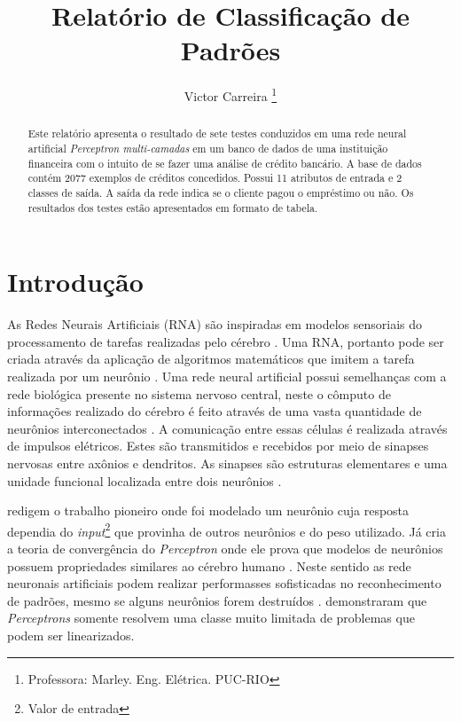 \documentclass[journal, a4paper]{IEEEtran}
\begin{document}
	\title{Relatório de Classificação de Padrões}
	\author{Victor Carreira
	\thanks{Professora: Marley. Eng. Elétrica. PUC-RIO}}
	\maketitle

\begin{abstract}
	Este relatório apresenta o resultado de sete testes conduzidos em uma rede neural artificial \textit{Perceptron multi-camadas} em um banco de dados de uma instituição financeira com o intuito de se fazer uma análise de crédito bancário.  A base de dados contém 2077 exemplos de créditos concedidos. Possui 11 atributos de entrada e 2 classes de saída. A saída da rede indica se o cliente pagou o empréstimo ou não. Os resultados dos testes estão apresentados em formato de tabela.
\end{abstract}

\section{Introdução}
    As Redes Neurais Artificiais (RNA) são inspiradas em modelos sensoriais do processamento de tarefas realizadas pelo cérebro \citep{Hagan1996}. Uma RNA, portanto pode ser criada através da aplicação de algoritmos matemáticos que imitem a tarefa realizada por um neurônio \citep{Nedjah2016}. Uma rede neural artificial possui semelhanças com a rede biológica presente no sistema nervoso central, neste o cômputo de informações realizado do cérebro é feito através de uma vasta quantidade de neurônios interconectados \citep{Feldman1988,Poulton2002}. A comunicação entre essas células é realizada através de impulsos elétricos. Estes são transmitidos e recebidos por meio de sinapses nervosas entre axônios e dendritos. As sinapses são estruturas elementares e uma unidade funcional localizada entre dois neurônios \citep{Krogh2008}.

	\citet{McCulloch1943} redigem o trabalho pioneiro onde foi modelado um neurônio cuja resposta dependia do \textit{input}\footnote{Valor de entrada} que provinha de outros neurônios e do peso utilizado.  Já \citet{Rosenblatt1962} cria a teoria de convergência do \textit{Perceptron} onde ele prova que modelos de neurônios possuem propriedades similares ao cérebro humano \citep{Kanal2001}. Neste sentido as rede neuronais artificiais podem realizar performasses sofisticadas no reconhecimento de padrões, mesmo se alguns neurônios forem destruídos \citep{Levy1997}. \citet{Minsky1969} demonstraram que \textit{Perceptrons} somente resolvem uma classe muito limitada de problemas que podem ser linearizados.
\end{document}
